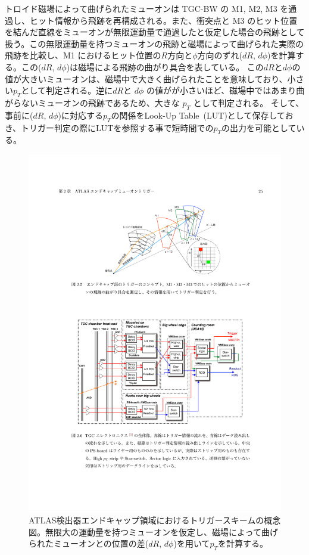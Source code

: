 トロイド磁場によって曲げられたミューオンは TGC-BW の M1, M2, M3 を通過し、ヒット情報から飛跡を再構成される。また、衝突点と M3 のヒット位置を結んだ直線をミューオンが無限運動量で通過したと仮定した場合の飛跡として扱う。この無限運動量を持つミューオンの飛跡と磁場によって曲げられた実際の飛跡を比較し、M1 におけるヒット位置の$R$方向と$\phi$方向のずれ($dR$, $d\phi$)を計算する。この($dR$, $d\phi$)は磁場による飛跡の曲がり具合を表している。
この$dR$と$d\phi$の値が大きいミューオンは、磁場中で大きく曲げられたことを意味しており、小さい$p_T$として判定される。逆に$dR$と $d\phi$ の値がが小さいほど、磁場中ではあまり曲がらないミューオンの飛跡であるため、大きな $p_T$ として判定される。
そして、事前に($dR$, $d\phi$)に対応する$p_T$の関係をLook-Up Table~(LUT)として保存しておき、トリガー判定の際にLUTを参照する事で短時間での$p_T$の出力を可能としている。

\begin{figure}[tb]
  \centering
  \includegraphics[clip, width=15cm]{fig/3/akatsuka_mt_trigger_scheme.pdf}
  \caption{ATLAS検出器エンドキャップ領域におけるトリガースキームの概念図\cite{article:akatsuka-mron}。無限大の運動量を持つミューオンを仮定し、磁場によって曲げられたミューオンとの位置の差($dR$, $d\phi$)を用いて$p_T$を計算する。}
  \label{fig:trigger-scheme}
\end{figure}

